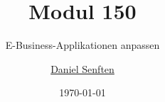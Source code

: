 \documentclass{manual}
\title{Modul 150}
\subtitle{E-Business-Applikationen anpassen}
\date{\today}
\author{\href{mailto:daniel.senften@talent-factory.ch}{Daniel Senften}}
\begin{document}


\newpage\appendix
\listofexercises

\renewcommand{\listoflistingscaption}{Programmbeispiele}
\newpage\listoflistings
\end{document}
